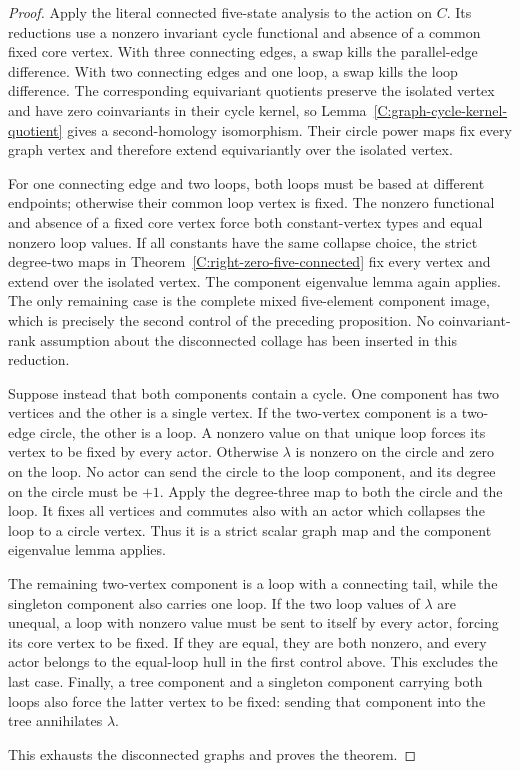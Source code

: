 \begin{proof}
Apply the literal connected five-state analysis to the action on
$C$.  Its reductions use a nonzero invariant cycle functional and
absence of a common fixed core vertex.  With three connecting
edges, a swap kills the parallel-edge difference.  With two
connecting edges and one loop, a swap kills the loop difference.
The corresponding equivariant quotients preserve the isolated
vertex and have zero coinvariants in their cycle kernel, so
Lemma~\ref{C:graph-cycle-kernel-quotient} gives a second-homology
isomorphism.  Their circle power maps fix every graph vertex and
therefore extend equivariantly over the isolated vertex.

For one connecting edge and two loops, both loops must be based
at different endpoints; otherwise their common loop vertex is
fixed.  The nonzero functional and absence of a fixed core vertex
force both constant-vertex types and equal nonzero loop values.
If all constants have the same collapse choice, the strict
degree-two maps in Theorem~\ref{C:right-zero-five-connected}
fix every vertex and extend over the isolated vertex.  The
component eigenvalue lemma again applies.  The only remaining
case is the complete mixed five-element component image, which
is precisely the second control of the preceding proposition.
No coinvariant-rank assumption about the disconnected collage
has been inserted in this reduction.

Suppose instead that both components contain a cycle.  One
component has two vertices and the other is a single vertex.
If the two-vertex component is a two-edge circle, the other is
a loop.  A nonzero value on that unique loop forces its vertex
to be fixed by every actor.  Otherwise $\lambda$ is nonzero on
the circle and zero on the loop.  No actor can send the circle
to the loop component, and its degree on the circle must be
$+1$.  Apply the degree-three map to both the circle and the
loop.  It fixes all vertices and commutes also with an actor
which collapses the loop to a circle vertex.  Thus it is a strict
scalar graph map and the component eigenvalue lemma applies.

The remaining two-vertex component is a loop with a connecting
tail, while the singleton component also carries one loop.
If the two loop values of $\lambda$ are unequal, a loop with
nonzero value must be sent to itself by every actor, forcing
its core vertex to be fixed.  If they are equal, they are both
nonzero, and every actor belongs to the equal-loop hull in the
first control above.  This excludes the last case.
Finally, a tree component and a singleton component carrying
both loops also force the latter vertex to be fixed: sending
that component into the tree annihilates $\lambda$.

This exhausts the disconnected graphs and proves the theorem.
\end{proof}
